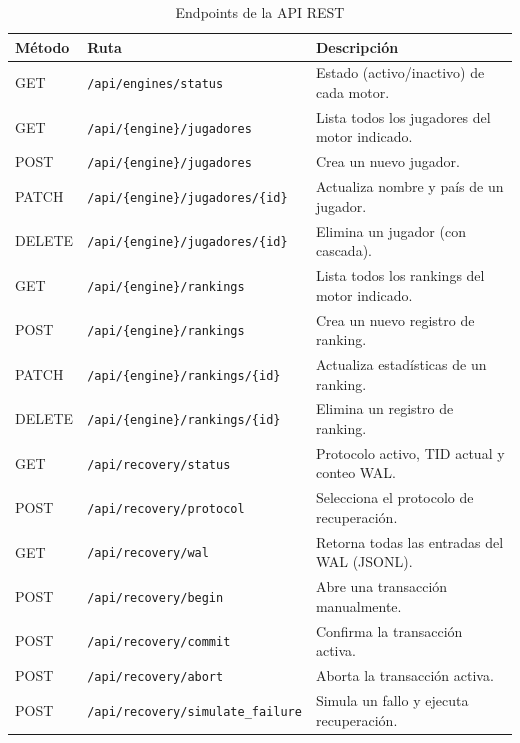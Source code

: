 \documentclass[12pt,letterpaper]{article}
\begin{document}
\begin{table}[H]
  \centering
  \caption{Endpoints de la API REST}
  \begin{tabularx}{\textwidth}{llX}
    \toprule
    \textbf{Método} & \textbf{Ruta} & \textbf{Descripción} \\
    \midrule
    GET    & \texttt{/api/engines/status}               & Estado (activo/inactivo) de cada motor. \\
    GET    & \texttt{/api/\{engine\}/jugadores}          & Lista todos los jugadores del motor indicado. \\
    POST   & \texttt{/api/\{engine\}/jugadores}          & Crea un nuevo jugador. \\
    PATCH  & \texttt{/api/\{engine\}/jugadores/\{id\}}  & Actualiza nombre y país de un jugador. \\
    DELETE & \texttt{/api/\{engine\}/jugadores/\{id\}}  & Elimina un jugador (con cascada). \\
    GET    & \texttt{/api/\{engine\}/rankings}           & Lista todos los rankings del motor indicado. \\
    POST   & \texttt{/api/\{engine\}/rankings}           & Crea un nuevo registro de ranking. \\
    PATCH  & \texttt{/api/\{engine\}/rankings/\{id\}}   & Actualiza estadísticas de un ranking. \\
    DELETE & \texttt{/api/\{engine\}/rankings/\{id\}}   & Elimina un registro de ranking. \\
    \midrule
    GET    & \texttt{/api/recovery/status}              & Protocolo activo, TID actual y conteo WAL. \\
    POST   & \texttt{/api/recovery/protocol}            & Selecciona el protocolo de recuperación. \\
    GET    & \texttt{/api/recovery/wal}                 & Retorna todas las entradas del WAL (JSONL). \\
    POST   & \texttt{/api/recovery/begin}               & Abre una transacción manualmente. \\
    POST   & \texttt{/api/recovery/commit}              & Confirma la transacción activa. \\
    POST   & \texttt{/api/recovery/abort}               & Aborta la transacción activa. \\
    POST   & \texttt{/api/recovery/simulate\_failure}   & Simula un fallo y ejecuta recuperación. \\
    \bottomrule
  \end{tabularx}
  \label{tab:api-endpoints}
\end{table}
\end{document}
